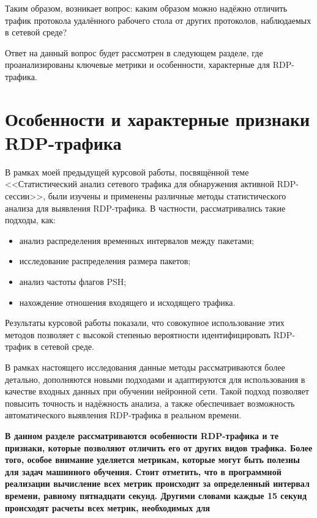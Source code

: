 \documentclass[bachelor, och, coursework]{SCWorks}
\begin{document}
Таким образом, возникает вопрос: каким образом можно надёжно отличить трафик протокола удалённого рабочего стола от других протоколов, наблюдаемых в сетевой среде?

Ответ на данный вопрос будет рассмотрен в следующем разделе, где проанализированы ключевые метрики и особенности, характерные для RDP-трафика.

\section{Особенности и характерные признаки RDP-трафика}

В рамках моей предыдущей курсовой работы, посвящённой теме <<Статистический анализ сетевого трафика для обнаружения активной RDP-сессии>>, 
были изучены и применены различные методы статистического анализа для выявления RDP-трафика. В частности, рассматривались такие подходы, как:  

\begin{itemize}
  \item анализ распределения временных интервалов между пакетами;  
  \item исследование распределения размера пакетов;  
  \item анализ частоты флагов PSH;  
  \item нахождение отношения входящего и исходящего трафика.  
\end{itemize}

Результаты курсовой работы показали, что совокупное использование этих методов позволяет с высокой степенью вероятности идентифицировать 
RDP-трафик в сетевой среде.  

В рамках настоящего исследования данные методы рассматриваются более детально, дополняются новыми подходами и адаптируются для использования 
в качестве входных данных при обучении нейронной сети. Такой подход позволяет повысить точность и надёжность анализа, а также обеспечивает 
возможность автоматического выявления RDP-трафика в реальном времени.  

\textbf{
В данном разделе рассматриваются особенности RDP-трафика и те признаки, которые позволяют отличить его от других видов трафика. Более того, особое 
внимание уделяется метрикам, которые могут быть полезны для задач машинного обучения. Стоит отметить, что в программной реализации вычисление всех метрик
происходит за определенный интервал времени, равному пятнадцати секунд. Другими словами каждые 15 секунд происходят расчеты всех метрик, необходимых для 
}
\end{document}

